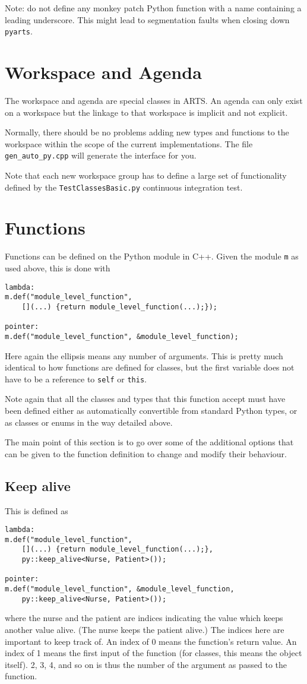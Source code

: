 Note: do not define any monkey patch Python function with a name containing a leading underscore.  This might lead to
segmentation faults when closing down \verb|pyarts|.

\section{Workspace and Agenda}
The workspace and agenda are special classes in ARTS.  An agenda can only exist on a workspace but the linkage to that workspace 
is implicit and not explicit.

Normally, there should be no problems adding new types and functions to the workspace within the scope of the current implementations.  The file \verb|gen_auto_py.cpp| will generate the interface for you.

Note that each new workspace group has to define a large set of functionality defined by the \verb|TestClassesBasic.py| continuous integration test.

\section{Functions}
Functions can be defined on the Python module in C++.
Given the module \verb|m| as used above, this is done with
\begin{verbatim}
lambda:
m.def("module_level_function",
    [](...) {return module_level_function(...);});

pointer:
m.def("module_level_function", &module_level_function);
\end{verbatim}
Here again the ellipsis means any number of arguments.
This is pretty much identical to how functions are defined for classes, but the first variable does not have to be a reference to \verb|self| or \verb|this|.

Note again that all the classes and types that this function accept must have been defined either as automatically convertible from standard Python types, or as classes or enums in the way detailed above.

The main point of this section is to go over some of the additional options that can be given to the function definition to change and modify their behaviour.

\subsection{Keep alive}
This is defined as
\begin{verbatim}
lambda:
m.def("module_level_function",
    [](...) {return module_level_function(...);},
    py::keep_alive<Nurse, Patient>());

pointer:
m.def("module_level_function", &module_level_function,
    py::keep_alive<Nurse, Patient>());
\end{verbatim}
where the nurse and the patient are indices indicating the value which keeps another value alive.  (The nurse keeps the patient alive.)
The indices here are important to keep track of.  An index of 0 means the function's return value.  An index of 1 means the first input of
the function (for classes, this means the object itself). 2, 3, 4, and so on is thus the number of the argument as passed to the function.


